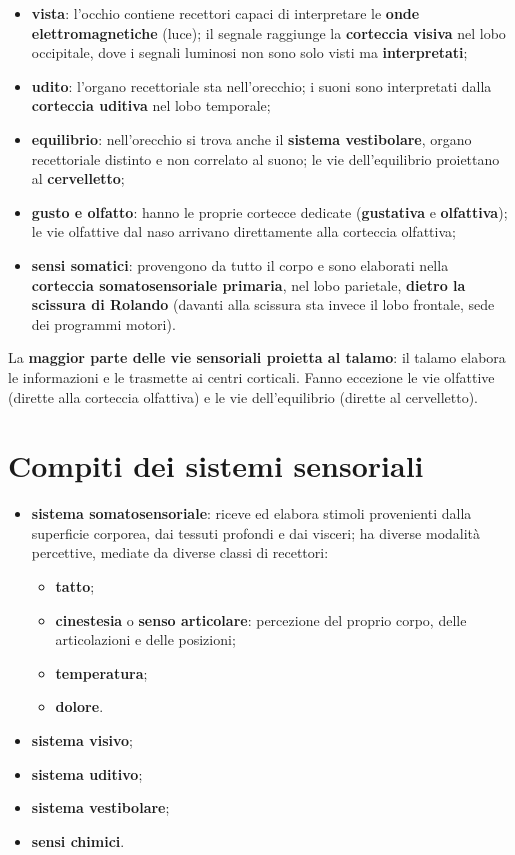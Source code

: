 \begin{itemize}
  \item \textbf{vista}: l'occhio contiene recettori capaci di interpretare le \textbf{onde
    elettromagnetiche} (luce); il segnale raggiunge la \textbf{corteccia visiva} nel lobo
    occipitale, dove i segnali luminosi non sono solo visti ma \textbf{interpretati};
  \item \textbf{udito}: l'organo recettoriale sta nell'orecchio; i suoni sono interpretati dalla
    \textbf{corteccia uditiva} nel lobo temporale;
  \item \textbf{equilibrio}: nell'orecchio si trova anche il \textbf{sistema vestibolare}, organo
    recettoriale distinto e non correlato al suono; le vie dell'equilibrio proiettano al
    \textbf{cervelletto};
  \item \textbf{gusto e olfatto}: hanno le proprie cortecce dedicate (\textbf{gustativa} e
    \textbf{olfattiva}); le vie olfattive dal naso arrivano direttamente alla corteccia olfattiva;
  \item \textbf{sensi somatici}: provengono da tutto il corpo e sono elaborati nella
    \textbf{corteccia somatosensoriale primaria}, nel lobo parietale, \textbf{dietro la scissura
    di Rolando} (davanti alla scissura sta invece il lobo frontale, sede dei programmi motori).
\end{itemize}

La \textbf{maggior parte delle vie sensoriali proietta al talamo}: il talamo elabora le
informazioni e le trasmette ai centri corticali. Fanno eccezione le vie olfattive (dirette alla
corteccia olfattiva) e le vie dell'equilibrio (dirette al cervelletto).

\section{Compiti dei sistemi sensoriali}

\begin{itemize}
  \item \textbf{sistema somatosensoriale}: riceve ed elabora stimoli provenienti dalla superficie
    corporea, dai tessuti profondi e dai visceri; ha diverse modalità percettive, mediate da
    diverse classi di recettori:
    \begin{itemize}
      \item \textbf{tatto};
      \item \textbf{cinestesia} o \textbf{senso articolare}: percezione del proprio corpo, delle
        articolazioni e delle posizioni;
      \item \textbf{temperatura};
      \item \textbf{dolore}.
    \end{itemize}
  \item \textbf{sistema visivo};
  \item \textbf{sistema uditivo};
  \item \textbf{sistema vestibolare};
  \item \textbf{sensi chimici}.
\end{itemize}

